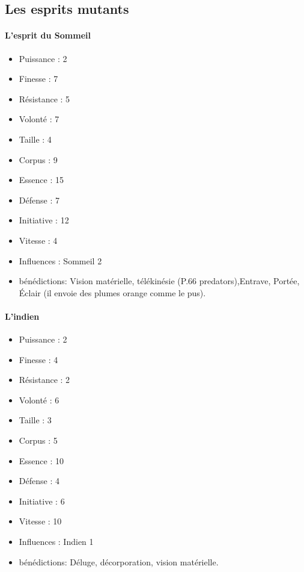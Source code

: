 \documentclass[oneside,12pt]{book}
\begin{document}
\begin{flushleft}
\subsection{Les esprits mutants}
\label{esprit_mutant}
\paragraph{L'esprit du Sommeil}
\begin{itemize}
\item Puissance : 2
\item Finesse : 7
\item Résistance : 5
\item Volonté : 7
\item Taille : 4
\item Corpus : 9
\item Essence : 15
\item Défense : 7
\item Initiative : 12
\item Vitesse : 4
\item Influences : Sommeil 2
\item bénédictions: Vision matérielle, télékinésie (P.66 predators),Entrave, Portée, Éclair (il envoie des plumes orange comme le pus). 
\end{itemize}

\paragraph{L'indien}
\begin{itemize}
\item Puissance : 2
\item Finesse : 4
\item Résistance : 2
\item Volonté : 6
\item Taille : 3
\item Corpus : 5
\item Essence : 10
\item Défense : 4
\item Initiative : 6
\item Vitesse : 10
\item Influences : Indien 1
\item bénédictions: Déluge, décorporation, vision matérielle.
\end{itemize}



\end{flushleft}
\end{document}
